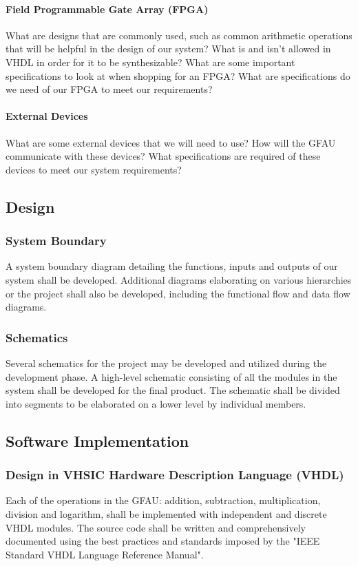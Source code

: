 \documentclass[paper=usletter, fontsize=12pt]{article}
\begin{document}
            \paragraph{Field Programmable Gate Array (FPGA)}What are designs that are commonly used, such as common arithmetic operations that will be helpful in the design of our system? What is and isn't allowed in VHDL in order for it to be synthesizable? What are some important specifications to look at when shopping for an FPGA? What are specifications do we need of our FPGA to meet our requirements?

            \paragraph{External Devices}What are some external devices that we will need to use? How will the GFAU communicate with these devices? What specifications are required of these devices to meet our system requirements?

        \subsection{Design}

            \subsubsection{System Boundary}A system boundary diagram detailing the functions, inputs and outputs of our system shall be developed. Additional diagrams elaborating on various hierarchies or the project shall also be developed, including the functional flow and data flow diagrams.

            \subsubsection{Schematics}Several schematics for the project may be developed and utilized during the development phase. A high-level schematic consisting of all the modules in the system shall be developed for the final product. The schematic shall be divided into segments to be elaborated on a lower level by individual members.

        \subsection{Software Implementation}

            \subsubsection{Design in VHSIC Hardware Description Language (VHDL)}Each of the operations in the GFAU: addition, subtraction, multiplication, division and logarithm, shall be implemented with independent and discrete VHDL modules. The source code shall be written and comprehensively documented using the best practices and standards imposed by the "IEEE Standard VHDL Language Reference Manual".
\end{document}
